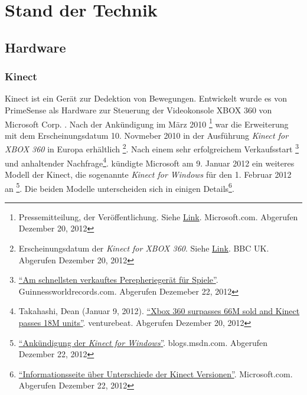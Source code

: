 \chapter{Stand der Technik}
\label{chap:Stand der Technik}

\section{Hardware}
\subsection{Kinect}
Kinect ist ein Ger\"at zur Dedektion von Bewegungen. Entwickelt wurde es von PrimeSense als Hardware zur Steuerung der Videokonsole 
XBOX 360 von Microsoft Corp. . Nach der Ank\"undigung im M\"arz 2010 \footnote{Pressemitteilung, der Ver\"offentlichung. Siehe \href{https://www.microsoft.com/en-us/news/press/2010/mar10/03-31PrimeSensePR.aspx}{Link}. Microsoft.com.  Abgerufen Dezember 20, 2012}
war die Erweiterung mit dem Erscheinungsdatum 10. Novmeber 2010 in der Ausf\"uhrung \textit{Kinect for XBOX 360} in Europa erh\"altlich \footnote{Erscheinungsdatum der \textit{Kinect for XBOX 360}. Siehe \href{http://www.bbc.co.uk/newsbeat/10996389}{Link}. BBC UK. Abgerufen Dezember 20, 2012}.
Nach einem sehr erfolgreichem Verkaufsstart \footnote{\href{http://www.guinnessworldrecords.com/records-9000/fastest-selling-gaming-peripheral/}{\enquote{Am schnellsten verkauftes Perepherieger\"at f\"ur Spiele}}. Guinnessworldrecords.com. Abgerufen Dezemeber 22, 2012}
und anhaltender Nachfrage\footnote{Takahashi, Dean (Januar 9, 2012). \href{http://venturebeat.com/2012/01/09/xbox-360-surpassed-66m-sold-and-kinect-has-sold-18m-units/}{\enquote{Xbox 360 surpasses 66M sold and Kinect passes 18M units}}. venturebeat. Abgerufen Dezember 20, 2012}.
k\"undigte Microsoft am 9. Januar 2012 ein weiteres Modell der Kinect, die sogenannte \textit{Kinect for Windows} f\"ur den 1. Februar 2012 an \footnote{\href{https://blogs.msdn.com/b/kinectforwindows/archive/2012/01/09/kinect-for-windows-commercial-program-announced.aspx?Redirected=true}{\enquote{Ank\"undigung der \textit{Kinect for Windows}}}. blogs.msdn.com. Abgerufen Dezember 22, 2012}.
\newline
Die beiden Modelle unterscheiden sich in einigen Details\footnote{\href{https://www.microsoft.com/en-us/kinectforwindows/news/faq.aspx}{\enquote{Informationsseite \"uber Unterschiede der Kinect Versionen}}. Microsoft.com. Abgerufen Dezember 22, 2012}.
